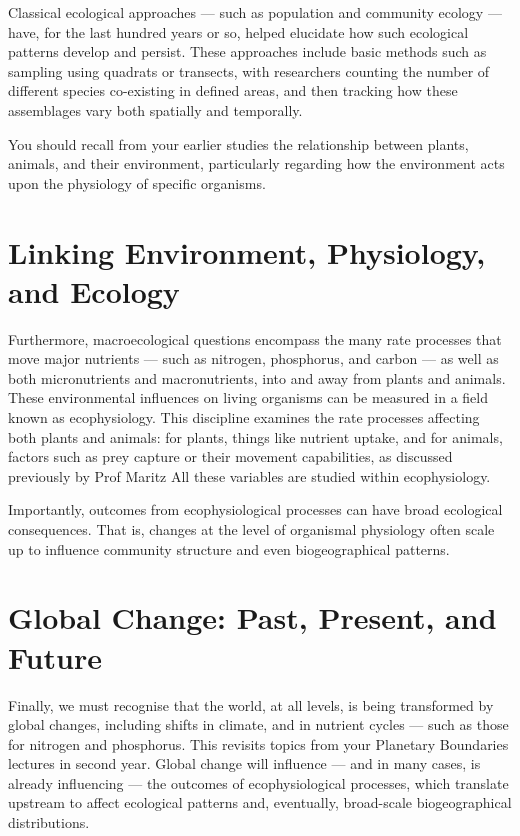 \documentclass[
  11pt,
]{book}
\begin{document}
Classical ecological approaches --- such as population and community
ecology --- have, for the last hundred years or so, helped elucidate how
such ecological patterns develop and persist. These approaches include
basic methods such as sampling using quadrats or transects, with
researchers counting the number of different species co-existing in
defined areas, and then tracking how these assemblages vary both
spatially and temporally.

You should recall from your earlier studies the relationship between
plants, animals, and their environment, particularly regarding how the
environment acts upon the physiology of specific organisms.

\section{Linking Environment, Physiology, and
Ecology}\label{linking-environment-physiology-and-ecology}

Furthermore, macroecological questions encompass the many rate processes
that move major nutrients --- such as nitrogen, phosphorus, and carbon
--- as well as both micronutrients and macronutrients, into and away
from plants and animals. These environmental influences on living
organisms can be measured in a field known as ecophysiology. This
discipline examines the rate processes affecting both plants and
animals: for plants, things like nutrient uptake, and for animals,
factors such as prey capture or their movement capabilities, as
discussed previously by Prof Maritz All these variables are studied
within ecophysiology.

Importantly, outcomes from ecophysiological processes can have broad
ecological consequences. That is, changes at the level of organismal
physiology often scale up to influence community structure and even
biogeographical patterns.

\section{Global Change: Past, Present, and
Future}\label{global-change-past-present-and-future}

Finally, we must recognise that the world, at all levels, is being
transformed by global changes, including shifts in climate, and in
nutrient cycles --- such as those for nitrogen and phosphorus. This
revisits topics from your Planetary Boundaries lectures in second year.
Global change will influence --- and in many cases, is already
influencing --- the outcomes of ecophysiological processes, which
translate upstream to affect ecological patterns and, eventually,
broad-scale biogeographical distributions.
\end{document}
